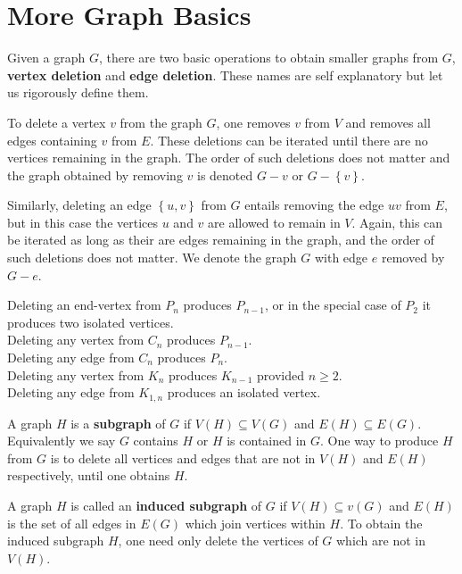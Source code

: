 \section{More Graph Basics}
Given a graph $G$, there are two basic operations to obtain smaller graphs from $G$, \textbf{vertex deletion} and \textbf{edge deletion}. These names are self explanatory but let us rigorously define them.
\begin{definition}
	To delete a vertex $v$ from the graph $G$, one removes $v$ from $V$ and removes all edges containing $v$ from $E$. These deletions can be iterated until there are no vertices remaining in the graph. The order of such deletions does not matter and the graph obtained by removing $v$ is denoted $G - v$ or $G - \left\{ v \right\} $.
\end{definition}
\begin{definition}
Similarly, deleting an edge $ \left\{ u,v \right\} $ from $G$ entails removing the edge  $uv$ from $E$, but in this case the vertices $u$ and $v$ are allowed to remain in $V$. Again, this can be iterated as long as their are edges remaining in the graph, and the order of such deletions does not matter. We denote the graph $G$ with edge $e$ removed by $G - e$.
\end{definition}
\begin{example}
Deleting an end-vertex from $P_{n}$ produces $P_{n-1}$, or in the special case of $P_2$ it produces two isolated vertices.\\
Deleting any vertex from $C_{n}$ produces $P_{n-1}$.\\
Deleting any edge from $C_{n}$ produces $P_{n}$.\\
Deleting any vertex from $K_{n}$ produces $K_{n-1}$ provided $n\ge 2$.\\
Deleting any edge from $K_{1,n}$ produces an isolated vertex.\\
\end{example}
\begin{definition}[Subgraphs]
	A graph $H$ is a \textbf{subgraph} of $G$ if $V\left( H \right) \subseteq V \left( G \right) $	 and $E\left( H \right) \subseteq E\left( G \right) $. Equivalently we say $G$ contains $H$ or $H$ is contained in $G$. One way to produce $H$ from $G$ is to delete all vertices and edges that are not in $V\left( H \right) $ and $E\left( H \right) $ respectively, until one obtains $H$.
\end{definition}
\begin{definition}
	A graph $H$ is called an \textbf{induced subgraph} of $G$ if $V\left( H \right) \subseteq v\left( G \right) $ and $E\left( H \right) $ is the set of all edges in $E\left( G \right) $ which join vertices within $H$. To obtain the induced subgraph $H$, one need only delete the vertices of $G$ which are not in $V\left( H \right) $.
\end{definition}
